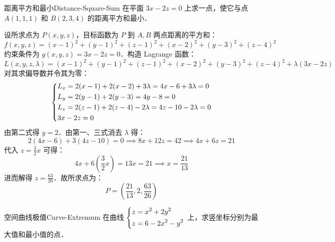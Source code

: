 \begin{problem}{距离平方和最小}{Distance-Square-Sum}
    在平面 $3x - 2z = 0$ 上求一点，使它与点 $A(1, 1, 1)$ 和 $B(2, 3, 4)$ 的距离平方和最小．
\end{problem}

\begin{solution}
    设所求点为 $P(x, y, z)$，目标函数为 $P$ 到 $A, B$ 两点距离的平方和：
    \begin{equation}
        f(x, y, z) = (x-1)^2 + (y-1)^2 + (z-1)^2 + (x-2)^2 + (y-3)^2 + (z-4)^2
    \end{equation}
    约束条件为 $g(x, y, z) = 3x - 2z = 0$．构造 Lagrange 函数：
    \begin{equation}
        L(x, y, z, \lambda) = (x-1)^2 + (y-1)^2 + (z-1)^2 + (x-2)^2 + (y-3)^2 + (z-4)^2 + \lambda(3x - 2z)
    \end{equation}
    对其求偏导数并令其为零：
    \begin{equation}
        \begin{dcases}
            L_x = 2(x-1) + 2(x-2) + 3\lambda = 4x - 6 + 3\lambda = 0  \\
            L_y = 2(y-1) + 2(y-3) = 4y - 8 = 0                        \\
            L_z = 2(z-1) + 2(z-4) - 2\lambda = 4z - 10 - 2\lambda = 0 \\
            3x - 2z = 0
        \end{dcases}
    \end{equation}
    由第二式得 $y = 2$．由第一、三式消去 $\lambda$ 得：
    \begin{equation}
        2(4x - 6) + 3(4z - 10) = 0 \implies 8x + 12z = 42 \implies 4x + 6z = 21
    \end{equation}
    代入 $z = \frac{3}{2}x$ 可得：
    \begin{equation}
        4x + 6\left( \frac{3}{2}x \right) = 13x = 21 \implies x = \frac{21}{13}
    \end{equation}
    进而解得 $z = \frac{63}{26}$．故所求点为：
    \begin{equation}
        \boxed{P = \left( \frac{21}{13}, 2, \frac{63}{26} \right)}
    \end{equation}
\end{solution}

\begin{problem}{空间曲线极值}{Curve-Extremum}
    在曲线 $\begin{dcases} z = x^2 + 2y^2 \\ z = 6 - 2x^2 - y^2 \end{dcases}$ 上，求竖坐标分别为最大值和最小值的点．
\end{problem}

